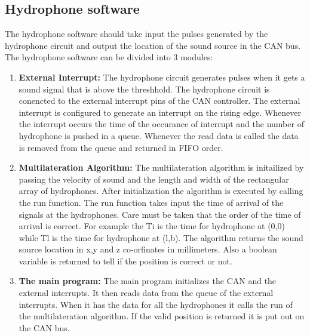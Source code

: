 \subsection{Hydrophone software}
The hydrophone software should take input the pulses generated by the hydrophone circuit and output the location of the sound source in the CAN bus. The hydrophone software can be divided into 3 modules:
\begin{enumerate}
\item \textbf{External Interrupt:} The hydrophone circuit generates pulses when it gets a sound signal that is above the threshhold. The hydrophone circuit is conencted to the external interrupt pins of the CAN controller. The external interrupt is configured to generate an interrupt on the rising edge. Whenever the interrupt occurs the time of the occurance of interrupt and the number of hydrophone is pushed in a queue. Whenever the read data is called the data is removed from the queue and returned in FIFO order.
\item \textbf{Multilateration Algorithm:} The multilateration algorithm is initailized by passing the velocity of sound and the length and width of the rectangular array of hydrophones. After initialization the algorithm is executed by calling the run function. The run function takes input the time of arrival of the signals at the hydrophones. Care must be taken that the order of the time of arrival is correct. For example the Ti is the time for hydrophone at (0,0) while Tl is the time for hydrophone at (l,b). The algorithm returns the sound source location in x,y and z co-orfinates in millimeters. Also a boolean variable is returned to tell if the position is correct or not.
\item \textbf{The main program:} The main program initializes the CAN and the external interrupts. It then reads data from the queue of the external interrupts. When it has the data for all the hydrophones it calls the run of the multilateration algorithm. If the valid position is returned it is put out on the CAN bus.
\end{enumerate}

